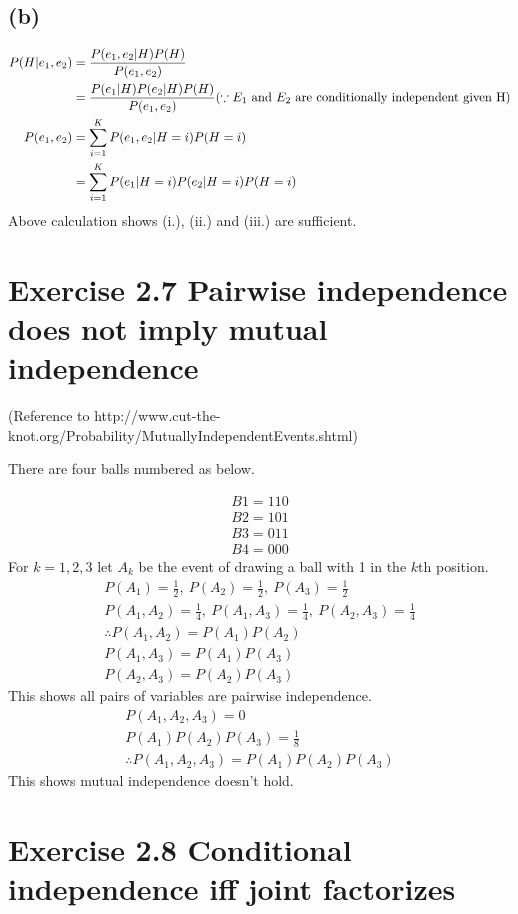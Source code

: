 \documentclass{jsarticle}
\begin{document}
\subsection*{(b)}
\begin{align}
P(H|e_1,e_2) & = \frac{P(e_1,e_2|H)P(H)}{P(e_1,e_2)}\\
& = \frac{P(e_1|H)P(e_2|H)P(H)}{P(e_1,e_2)} (\because E_1\ {\rm and}\ E_2\ {\rm are\ conditionally\ independent\ given\ H}) \\
P(e_1,e_2) &= \sum_{i=1}^{K}P(e_1,e_2|H=i)P(H=i)\\
&= \sum_{i=1}^{K}P(e_1|H=i)P(e_2|H=i)P(H=i)
\end{align}
Above calculation shows (i.), (ii.) and (iii.) are sufficient.

\section*{Exercise 2.7 Pairwise independence does not imply mutual independence}
(Reference to http://www.cut-the-knot.org/Probability/MutuallyIndependentEvents.shtml)

There are four balls numbered as below.

\begin{align*}
B1 = 110 \\
B2 = 101 \\
B3 = 011 \\
B4 = 000
\end{align*}
For $k=1,2,3$ let $A_k$ be the event of drawing a ball with 1 in the $k$th position.
\begin{align}
P(A_1)=\frac{1}{2},\ P(A_2)=\frac{1}{2},\ P(A_3)=\frac{1}{2}\\
P(A_1,A_2)=\frac{1}{4},\ P(A_1, A_3)=\frac{1}{4},\ P(A_2, A_3)=\frac{1}{4}\\
\therefore P(A_1, A_2)=P(A_1)P(A_2)\\
P(A_1, A_3)=P(A_1)P(A_3)\\
P(A_2,A_3)=P(A_2)P(A_3)
\end{align}
This shows all pairs of variables are pairwise independence.
\begin{align}
P(A_1,A_2,A_3)=0\\
P(A_1)P(A_2)P(A_3)=\frac{1}{8}\\
\therefore P(A_1,A_2,A_3)=P(A_1)P(A_2)P(A_3)
\end{align}
This shows mutual independence doesn't hold.

\section*{Exercise 2.8 Conditional independence iff joint factorizes}
\end{document}
